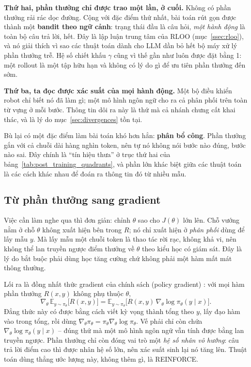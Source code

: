 \textbf{Thứ hai, phần thưởng chỉ được trao một lần, ở cuối.} Không có phần thưởng rải rác dọc đường. Cộng với đặc điểm thứ nhất, bài toán rút gọn được thành một \textbf{bandit theo ngữ cảnh}: trạng thái đầu là câu hỏi, \emph{một hành động} là toàn bộ câu trả lời, hết. Đây là lập luận trung tâm của RLOO (mục~\ref{ssec:rloo}), và nó giải thích vì sao các thuật toán dành cho LLM dần bỏ hết bộ máy xử lý phần thưởng trễ. Hệ số chiết khấu $\gamma$ cũng vì thế gần như luôn được đặt bằng 1: một rollout là một tập hữu hạn và không có lý do gì để ưu tiên phần thưởng đến sớm.

\textbf{Thứ ba, ta đọc được xác suất của mọi hành động.} Một bộ điều khiển robot chỉ biết nó đã làm gì; một mô hình ngôn ngữ cho ra cả phân phối trên toàn từ vựng ở mỗi bước. Thông tin dôi ra này là thứ mà cả nhánh chưng cất khai thác, và là lý do mục~\ref{sec:divergences} tồn tại.

Bù lại có một đặc điểm làm bài toán khó hơn hẳn: \textbf{phân bổ công}. Phần thưởng gắn với cả chuỗi dài hàng nghìn token, nên tự nó không nói bước nào đúng, bước nào sai. Đây chính là ``tín hiệu thưa'' ở trục thứ hai của bảng~\ref{tab:post_training_quadrants}, và phần lớn khác biệt giữa các thuật toán là các cách khác nhau để đoán ra thông tin đó từ nhiều mẫu.

\subsection{Từ phần thưởng sang gradient}
\label{ssec:policy_gradient}

Việc cần làm nghe qua thì đơn giản: chỉnh $\theta$ sao cho $J(\theta)$ lớn lên. Chỗ vướng nằm ở chỗ $\theta$ không xuất hiện bên trong $R$; nó chỉ xuất hiện ở \emph{phân phối} dùng để lấy mẫu $y$. Mà lấy mẫu một chuỗi token là thao tác rời rạc, không khả vi, nên không thể lan truyền ngược điểm thưởng về $\theta$ theo kiểu học có giám sát. Đây là lý do bắt buộc phải dùng học tăng cường chứ không phải một hàm mất mát thông thường.

Lối ra là đồng nhất thức gradient của chính sách (policy gradient) \cite{williams1992reinforce, sutton2000policygradient}: với mọi hàm phần thưởng $R(x,y)$ không phụ thuộc $\theta$,
\[
\nabla_{\theta}\,
\mathbb{E}_{y \sim \pi_{\theta}}\big[ R(x,y) \big]
= \mathbb{E}_{y \sim \pi_{\theta}}\big[
	R(x,y)\, \nabla_{\theta} \log \pi_{\theta}(y \mid x)
\big].
\]
Đẳng thức này có được bằng cách viết kỳ vọng thành tổng theo $y$, lấy đạo hàm vào trong tổng, rồi dùng $\nabla_{\theta} \pi_{\theta} = \pi_{\theta} \nabla_{\theta} \log \pi_{\theta}$. Vế phải chỉ còn chứa $\nabla_{\theta} \log \pi_{\theta}(y \mid x)$ -- đúng thứ mà một mô hình ngôn ngữ vẫn tính được bằng lan truyền ngược. Phần thưởng chỉ còn đóng vai trò một \emph{hệ số nhân vô hướng}: câu trả lời điểm cao thì được nhân hệ số lớn, nên xác suất sinh lại nó tăng lên. Thuật toán dùng thẳng ước lượng này, không thêm gì, là REINFORCE.

